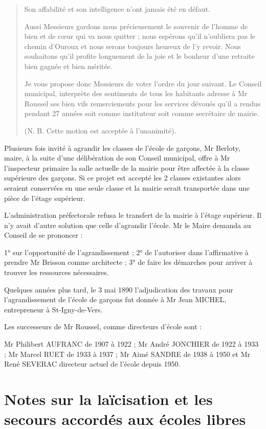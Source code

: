 \begin{quote}
Son affabilité et son intelligence n'ont jamais été en défaut.

Aussi Messieurs gardons nous précieusement le souvenir de l'homme de bien et de cœur qui va nous quitter ; nous espérons qu'il n'oubliera pas le chemin d'Ouroux et nous serons toujours heureux de l'y revoir. Nous souhaitons qu'il profite longuement de la joie et le bonheur d'une retraite bien gagnée et bien méritée.

Je vous propose donc Messieurs de voter l'ordre du jour suivant. Le Conseil municipal, interprète des sentiments de tous les habitants adresse à Mr Roussel ses bien vifs remerciements pour les services dévoués qu'il a rendus pendant 27 années soit comme instituteur soit comme secrétaire de mairie.

(N. B. Cette motion est acceptée à l'unanimité).
\end{quote}

Plusieurs fois invité à agrandir les classes de l'école de garçons, Mr Berloty, maire, à la suite d'une délibération de son Conseil municipal, offre à Mr l'inspecteur primaire la salle actuelle de la mairie pour être affectée à la classe supérieure des garçons. Si ce projet est accepté les 2 classes existantes alors seraient conservées en une seule classe et la mairie serait transportée dans une pièce de l'étage supérieur.

L'administration préfectorale refusa le transfert de la mairie à l'étage supérieur. Il n'y avait d'autre solution que celle d'agrandir l'école. Mr le Maire demanda au Conseil de se prononcer :

1° sur l'opportunité de l'agrandissement ; 2° de l'autoriser dans l'affirmative à prendre Mr Brisson comme architecte ; 3° de faire les démarches pour arriver à trouver les ressources nécessaires.

Quelques années plus tard, le 3 mai 1890 l'adjudication des travaux pour l'agrandissement de l'école de garçons fut donnée à Mr Jean MICHEL, entrepreneur à St-Igny-de-Vers.

Les successeurs de Mr Roussel, comme directeurs d'école sont :

Mr Philibert AUFRANC de 1907 à 1922 ; Mr André JONCHIER de 1922 à 1933 ; Mr Marcel RUET de 1933 à 1937 ; Mr Aimé SANDRE de 1938 à 1950 et Mr René SEVERAC directeur actuel de l'école depuis 1950.

\section*{Notes sur la laïcisation et les secours accordés aux écoles libres}


